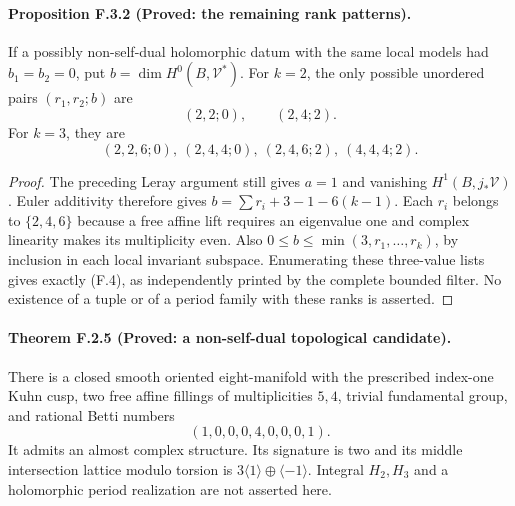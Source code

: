 \paragraph{Proposition F.3.2 (Proved: the remaining rank patterns).}
If a possibly non-self-dual holomorphic datum with the same
local models had $b_1=b_2=0$, put
$b=\dim H^0(B,\mathcal V^*)$.  For $k=2$, the only possible
unordered pairs $(r_1,r_2;b)$ are
\[
 (2,2;0),\qquad(2,4;2).
\]
For $k=3$, they are
\[
 (2,2,6;0),\ (2,4,4;0),\ (2,4,6;2),\ (4,4,4;2).
 \tag{F.4}
\]

\begin{proof}
The preceding Leray argument still gives $a=1$ and vanishing
$H^1(B,j_*\mathcal V)$.  Euler additivity therefore gives
$b=\sum r_i+3-1-6(k-1)$.  Each $r_i$ belongs to
$\{2,4,6\}$ because a free affine lift requires an eigenvalue
one and complex linearity makes its multiplicity even.
Also $0\leq b\leq\min(3,r_1,\ldots,r_k)$, by inclusion in
each local invariant subspace.  Enumerating these three-value
lists gives exactly (F.4), as independently printed by the
complete bounded filter.  No existence of a tuple or of a
period family with these ranks is asserted.
\end{proof}

\paragraph{Theorem F.2.5 (Proved: a non-self-dual topological candidate).}
There is a closed smooth oriented eight-manifold with the prescribed
index-one Kuhn cusp, two free affine fillings of multiplicities $5,4$,
trivial fundamental group, and rational Betti numbers
\[
 (1,0,0,0,4,0,0,0,1). \tag{F.5}
\]
It admits an almost complex structure.  Its signature is two and
its middle intersection lattice modulo torsion is
$3\langle1\rangle\oplus\langle-1\rangle$.
Integral $H_2,H_3$ and a holomorphic period realization are not
asserted here.

